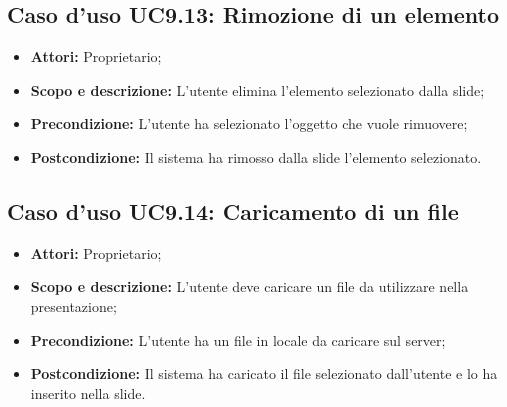 \subsection{Caso d'uso UC9.13: Rimozione di un elemento}
\begin{itemize}
	\item \textbf{Attori:} Proprietario;
	\item \textbf{Scopo e descrizione:} L'utente elimina l'elemento selezionato dalla \gls{slide};
	\item \textbf{Precondizione:} L'utente ha selezionato l'oggetto che vuole rimuovere;
	\item \textbf{Postcondizione:} Il sistema ha rimosso dalla \gls{slide} l'elemento selezionato.
\end{itemize}


\subsection{Caso d'uso UC9.14: Caricamento di un file}
\begin{itemize}
	\item \textbf{Attori:} Proprietario;
	\item \textbf{Scopo e descrizione:} L'utente deve caricare un file da utilizzare nella presentazione;
	\item \textbf{Precondizione:} L'utente ha un file in locale da caricare sul server;
	\item \textbf{Postcondizione:} Il sistema ha caricato il file selezionato dall'utente e lo ha inserito nella \gls{slide}.
\end{itemize}

\newpage
